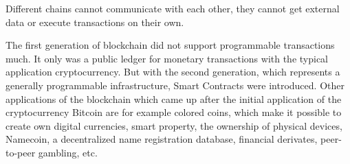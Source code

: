 \documentclass[conference]{IEEEtran}
\begin{document}
Different chains cannot communicate with each other, they cannot get external data or execute transactions on their own. \cite{Wang2017} \par 
The first generation of blockchain did not support programmable transactions much. It only was a public ledger for monetary transactions with the typical application cryptocurrency. But with the second generation, which represents a generally programmable infrastructure, Smart Contracts were introduced. \cite{Xu2016} Other applications of the blockchain which came up after the initial application of the cryptocurrency Bitcoin are for example colored coins, which make it possible to create own digital currencies, smart property, the ownership of physical devices, Namecoin, a decentralized name registration database, financial derivates, peer-to-peer gambling, etc. \cite{Buterin2014}
\end{document}
